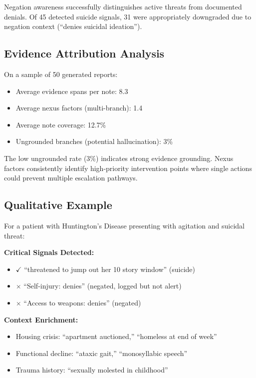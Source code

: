 \documentclass[conference]{IEEEtran}
\begin{document}
Negation awareness successfully distinguishes active threats from documented denials. Of 45 detected suicide signals, 31 were appropriately downgraded due to negation context (``denies suicidal ideation'').

\subsection{Evidence Attribution Analysis}

On a sample of 50 generated reports:

\begin{itemize}
\item Average evidence spans per note: 8.3
\item Average nexus factors (multi-branch): 1.4
\item Average note coverage: 12.7\%
\item Ungrounded branches (potential hallucination): 3\%
\end{itemize}

The low ungrounded rate (3\%) indicates strong evidence grounding. Nexus factors consistently identify high-priority intervention points where single actions could prevent multiple escalation pathways.

\subsection{Qualitative Example}

For a patient with Huntington's Disease presenting with agitation and suicidal threat:

\textbf{Critical Signals Detected:}
\begin{itemize}
\item $\checkmark$ ``threatened to jump out her 10 story window'' (suicide)
\item $\times$ ``Self-injury: denies'' (negated, logged but not alert)
\item $\times$ ``Access to weapons: denies'' (negated)
\end{itemize}

\textbf{Context Enrichment:}
\begin{itemize}
\item Housing crisis: ``apartment auctioned,'' ``homeless at end of week''
\item Functional decline: ``ataxic gait,'' ``monosyllabic speech''
\item Trauma history: ``sexually molested in childhood''
\end{itemize}
\end{document}
